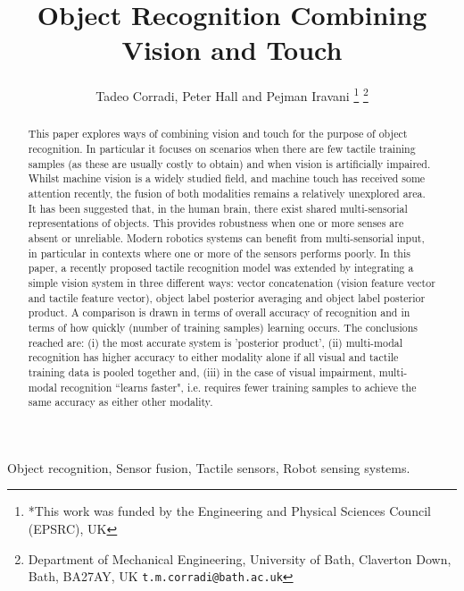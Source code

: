 \documentclass[9pt,technote]{IEEEtran}  %
\title{Object Recognition Combining Vision and Touch}
\author{Tadeo Corradi, Peter Hall and Pejman Iravani%
	\thanks{*This work was funded by the Engineering and Physical Sciences Council (EPSRC), UK}%
	\thanks{Department of Mechanical Engineering, University of Bath, Claverton Down, Bath, BA27AY, UK
		{\tt\small t.m.corradi@bath.ac.uk}}%
}
\begin{document}
\maketitle

\begin{abstract}
This paper explores ways of combining vision and touch for the purpose of object recognition. In particular it focuses on scenarios when there are few tactile training samples (as these are usually costly to obtain) and when vision is artificially impaired.
Whilst machine vision is a widely studied field, and machine touch has received some attention recently, the fusion of both modalities remains a relatively unexplored area.
It has been suggested that, in the human brain, there exist shared multi-sensorial representations of objects. This provides robustness when one or more senses are absent or unreliable. Modern robotics systems can benefit from multi-sensorial input, in particular in contexts where one or more of the sensors performs poorly. 
In this paper, a recently proposed tactile recognition model was extended by integrating a simple vision system in three different ways: vector concatenation (vision feature vector and tactile feature vector), object label posterior averaging and object label posterior product. A comparison is drawn in terms of overall accuracy of recognition and in terms of how quickly (number of training samples) learning occurs.
The conclusions reached are: (i) the most accurate system is 'posterior product', (ii) multi-modal recognition has higher accuracy to either modality alone if all visual and tactile training data is pooled together and, (iii) in the case of visual impairment, multi-modal recognition ``learns faster", i.e. requires fewer training samples to achieve the same accuracy as either other modality.
\end{abstract}

\begin{IEEEkeywords}
	Object recognition, Sensor fusion, Tactile sensors, Robot sensing systems.
\end{IEEEkeywords}
\end{document}
